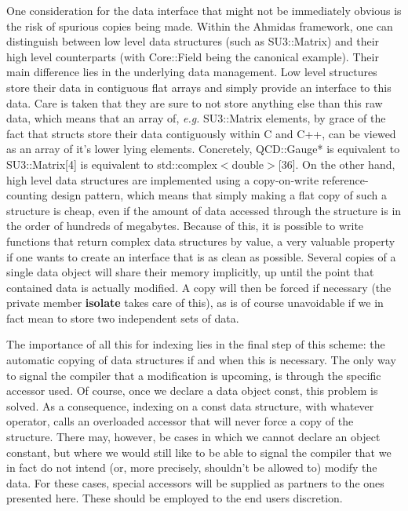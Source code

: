 \documentclass[a4paper,12pt,twoside]{article}
\begin{document}
One consideration for the data interface that might not be immediately obvious is the risk of spurious copies being made. Within the Ahmidas framework, one can distinguish between low level data structures (such as SU3::Matrix) and their high level counterparts (with Core::Field being the canonical example). Their main difference lies in the underlying data management. Low level structures store their data in contiguous flat arrays and simply provide an interface to this data. Care is taken that they are sure to not store anything else than this raw data, which means that an array of, \textit{e.g.} SU3::Matrix elements, by grace of the fact that structs store their data contiguously within C and C++, can be viewed as an array of it's lower lying elements. Concretely, QCD::Gauge* is equivalent to SU3::Matrix[4] is equivalent to std::complex$<$double$>$[36]. On the other hand, high level data structures are implemented using a copy-on-write reference-counting design pattern, which means that simply making a flat copy of such a structure is cheap, even if the amount of data accessed through the structure is in the order of hundreds of megabytes. Because of this, it is possible to write functions that return complex data structures by value, a very valuable property if one wants to create an interface that is as clean as possible. Several copies of a single data object will share their memory implicitly, up until the point that contained data is actually modified. A copy will then be forced if necessary (the private member \textbf{isolate} takes care of this), as is of course unavoidable if we in fact mean to store two independent sets of data.

The importance of all this for indexing lies in the final step of this scheme: the automatic copying of data structures if and when this is necessary. The only way to signal the compiler that a modification is upcoming, is through the specific accessor used. Of course, once we declare a data object const, this problem is solved. As a consequence, indexing on a const data structure, with whatever operator, calls an overloaded accessor that will never force a copy of the structure. There may, however, be cases in which we cannot declare an object constant, but where we would still like to be able to signal the compiler that we in fact do not intend (or, more precisely, shouldn't be allowed to) modify the data. For these cases, special accessors will be supplied as partners to the ones presented here. These should be employed to the end users discretion.
\end{document}

